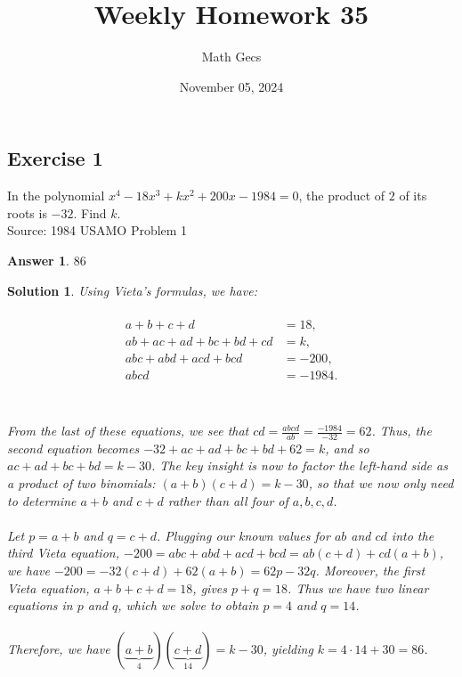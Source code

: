 \documentclass[12pt]{article}
\title{Weekly Homework 35}
\author{Math Gecs}
\date{November 05, 2024}
\newtheorem*{answer*}{Answer}
\newtheorem*{solution*}{Solution}
\begin{document}
\maketitle

\subsection*{Exercise 1}
In the polynomial $x^4 - 18x^3 + kx^2 + 200x - 1984 = 0$, the product of $2$ of its roots is $- 32$. Find $k$.\\

Source: 1984 USAMO Problem 1\\

\begin{answer*}
$\boxed{86}$
\end{answer*}

\begin{solution*}
Using Vieta's formulas, we have:
\\ \\
\begin{align*}a+b+c+d &= 18,\\ ab+ac+ad+bc+bd+cd &= k,\\ abc+abd+acd+bcd &=-200,\\ abcd &=-1984.\\ \end{align*}
\\ \\
From the last of these equations, we see that $cd = \frac{abcd}{ab} = \frac{-1984}{-32} = 62$. Thus, the second equation becomes $-32+ac+ad+bc+bd+62=k$, and so $ac+ad+bc+bd=k-30$. The key insight is now to factor the left-hand side as a product of two binomials: $(a+b)(c+d)=k-30$, so that we now only need to determine $a+b$ and $c+d$ rather than all four of $a,b,c,d$.
\\ \\
Let $p=a+b$ and $q=c+d$. Plugging our known values for $ab$ and $cd$ into the third Vieta equation, $-200 = abc+abd + acd + bcd = ab(c+d) + cd(a+b)$, we have $-200 = -32(c+d) + 62(a+b) = 62p-32q$. Moreover, the first Vieta equation, $a+b+c+d=18$, gives $p+q=18$. Thus we have two linear equations in $p$ and $q$, which we solve to obtain $p=4$ and $q=14$.
\\ \\
Therefore, we have $(\underbrace{a+b}_4)(\underbrace{c+d}_{14}) = k-30$, yielding $k=4\cdot 14+30 = \boxed{86}$.
\end{solution*}
\end{document}
